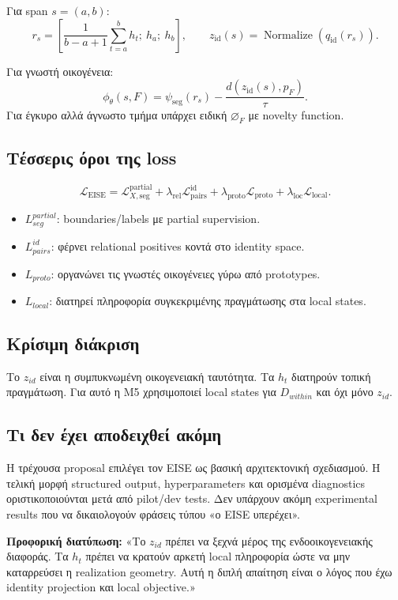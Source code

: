\documentclass[9pt,a4paper]{extarticle}
\newcommand{\say}[1]{\begin{keybox}\textbf{Προφορική διατύπωση:} #1\end{keybox}}
\begin{document}
Για span \(s=(a,b)\):
\[
r_s=\left[\frac{1}{b-a+1}\sum_{t=a}^{b}h_t;\ h_a;\ h_b\right],
\qquad
z_{\mathrm{id}}(s)=\operatorname{Normalize}(q_{\mathrm{id}}(r_s)).
\]

Για γνωστή οικογένεια:
\[
\phi_\theta(s,F)=\psi_{\mathrm{seg}}(r_s)-\frac{d(z_{\mathrm{id}}(s),p_F)}{\tau}.
\]
Για έγκυρο αλλά άγνωστο τμήμα υπάρχει ειδική \(\varnothing_F\) με novelty function.

\subsection*{Τέσσερις όροι της loss}
\[
\mathcal L_{\mathrm{EISE}}=
\mathcal L_{X,\mathrm{seg}}^{\mathrm{partial}}
+\lambda_{\mathrm{rel}}\mathcal L_{\mathrm{pairs}}^{\mathrm{id}}
+\lambda_{\mathrm{proto}}\mathcal L_{\mathrm{proto}}
+\lambda_{\mathrm{loc}}\mathcal L_{\mathrm{local}}.
\]
\begin{itemize}
\item \(L_{seg}^{partial}\): boundaries/labels με partial supervision.
\item \(L_{pairs}^{id}\): φέρνει relational positives κοντά στο identity space.
\item \(L_{proto}\): οργανώνει τις γνωστές οικογένειες γύρω από prototypes.
\item \(L_{local}\): διατηρεί πληροφορία συγκεκριμένης πραγμάτωσης στα local states.
\end{itemize}

\subsection*{Κρίσιμη διάκριση}
Το \(z_{id}\) είναι η συμπυκνωμένη οικογενειακή ταυτότητα. Τα \(h_t\) διατηρούν τοπική πραγμάτωση. Για αυτό η M5 χρησιμοποιεί local states για \(D_{within}\) και όχι μόνο \(z_{id}\).

\subsection*{Τι δεν έχει αποδειχθεί ακόμη}
Η τρέχουσα proposal επιλέγει τον EISE ως βασική αρχιτεκτονική σχεδιασμού. Η τελική μορφή structured output, hyperparameters και ορισμένα diagnostics οριστικοποιούνται μετά από pilot/dev tests. Δεν υπάρχουν ακόμη experimental results που να δικαιολογούν φράσεις τύπου «ο EISE υπερέχει».

\say{«Το \(z_{id}\) πρέπει να ξεχνά μέρος της ενδοοικογενειακής διαφοράς. Τα \(h_t\) πρέπει να κρατούν αρκετή local πληροφορία ώστε να μην καταρρεύσει η realization geometry. Αυτή η διπλή απαίτηση είναι ο λόγος που έχω identity projection και local objective.»}
\end{document}
